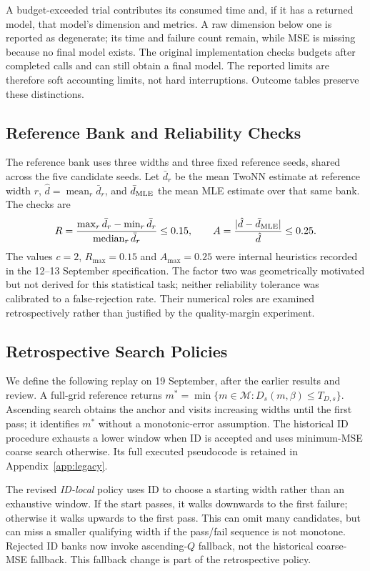 A budget-exceeded trial contributes its consumed time and, if it has a
returned model, that model's dimension and metrics. A raw dimension below
one is reported as degenerate; its time and failure count remain, while
MSE is missing because no final model exists. The original implementation
checks budgets after completed calls and can still obtain a final model.
The reported limits are therefore soft accounting limits, not hard
interruptions. Outcome tables preserve these distinctions.

\subsection{Reference Bank and Reliability Checks}\label{sec:algorithm}
The reference bank uses three widths and
three fixed reference seeds, shared across the five candidate seeds.
Let $\bar d_r$ be the mean TwoNN estimate at reference width $r$,
$\hat d=\operatorname{mean}_r\bar d_r$, and $\bar d_{\rm MLE}$ the mean
MLE estimate over that same bank. The checks are
\begin{equation}
 R=\frac{\max_r\bar d_r-\min_r\bar d_r}{\operatorname{median}_r\bar d_r}
 \le0.15,\qquad
 A=\frac{|\hat d-\bar d_{\rm MLE}|}{\hat d}\le0.25.
 \label{eq:checks}
\end{equation}
The values $c=2$, $R_{\max}=0.15$ and $A_{\max}=0.25$ were internal
heuristics recorded in the 12--13 September specification. The factor
two was geometrically motivated but not derived for this statistical
task; neither reliability tolerance was calibrated to a false-rejection
rate. Their numerical roles are examined retrospectively rather than
justified by the quality-margin experiment.

\subsection{Retrospective Search Policies}\label{sec:replay}
We define the following replay on 19 September, after the earlier
results and review. A full-grid reference returns
$m^*=\min\{m\in\mathcal M:D_s(m,\beta)\le T_{D,s}\}$.
Ascending search obtains the anchor and visits increasing widths until
the first pass; it identifies $m^*$ without a monotonic-error assumption.
The historical ID procedure exhausts a lower window when ID is accepted
and uses minimum-MSE coarse search otherwise. Its full executed
pseudocode is retained in Appendix~\ref{app:legacy}.

The revised \emph{ID-local} policy uses ID to choose a starting width
rather than an exhaustive window. If the start passes, it walks
downwards to the first failure; otherwise it walks upwards to the first
pass. This can omit many candidates, but can miss a smaller qualifying
width if the pass/fail sequence is not monotone. Rejected ID banks now
invoke ascending-$Q$ fallback, not the historical coarse-MSE fallback.
This fallback change is part of the retrospective policy.

